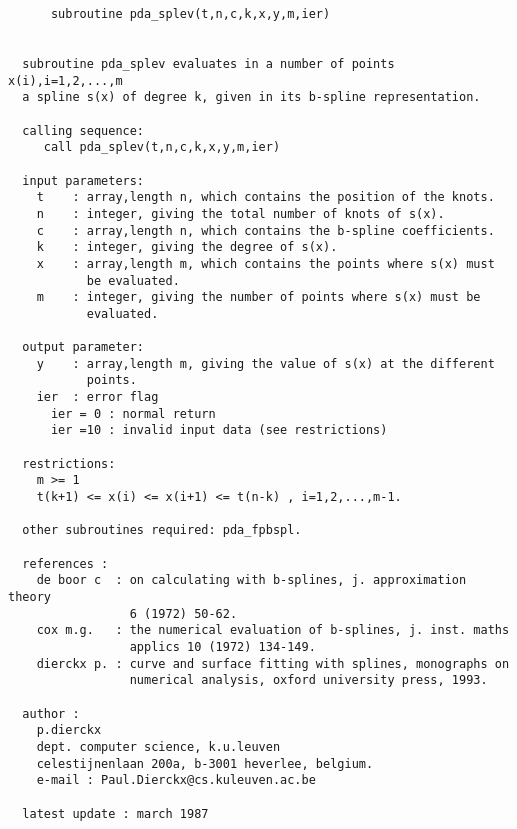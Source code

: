 \begin{verbatim}
      subroutine pda_splev(t,n,c,k,x,y,m,ier)


  subroutine pda_splev evaluates in a number of points x(i),i=1,2,...,m
  a spline s(x) of degree k, given in its b-spline representation.

  calling sequence:
     call pda_splev(t,n,c,k,x,y,m,ier)

  input parameters:
    t    : array,length n, which contains the position of the knots.
    n    : integer, giving the total number of knots of s(x).
    c    : array,length n, which contains the b-spline coefficients.
    k    : integer, giving the degree of s(x).
    x    : array,length m, which contains the points where s(x) must
           be evaluated.
    m    : integer, giving the number of points where s(x) must be
           evaluated.

  output parameter:
    y    : array,length m, giving the value of s(x) at the different
           points.
    ier  : error flag
      ier = 0 : normal return
      ier =10 : invalid input data (see restrictions)

  restrictions:
    m >= 1
    t(k+1) <= x(i) <= x(i+1) <= t(n-k) , i=1,2,...,m-1.

  other subroutines required: pda_fpbspl.

  references :
    de boor c  : on calculating with b-splines, j. approximation theory
                 6 (1972) 50-62.
    cox m.g.   : the numerical evaluation of b-splines, j. inst. maths
                 applics 10 (1972) 134-149.
    dierckx p. : curve and surface fitting with splines, monographs on
                 numerical analysis, oxford university press, 1993.

  author :
    p.dierckx
    dept. computer science, k.u.leuven
    celestijnenlaan 200a, b-3001 heverlee, belgium.
    e-mail : Paul.Dierckx@cs.kuleuven.ac.be

  latest update : march 1987
\end{verbatim}



